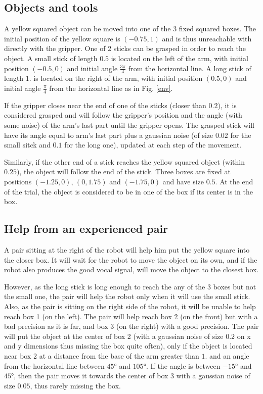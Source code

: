 \documentclass[conference]{include/IEEEtran}
\begin{document}
	
		
	\subsection{Objects and tools}
		
		A yellow squared object can be moved into one of the 3 fixed squared boxes. 
		The initial position of the yellow square is $(-0.75, 1)$ and is thus unreachable with directly with the gripper.
		One of 2 sticks can be grasped in order to reach the object.
		A small stick of length $0.5$ is located on the left of the arm, with initial position $(-0.5, 0)$ and initial angle $\frac{3\pi}{4}$ from the horizontal line.
		A long stick of length $1.$ is located on the right of the arm, with initial position $(0.5, 0)$ and initial angle $\frac{\pi}{4}$ from the horizontal line as in Fig. \ref{env}.
		
		If the gripper closes near the end of one of the sticks (closer than $0.2$), it is considered grasped and will follow the gripper's position and the angle (with some noise) of the arm's last part until the gripper opens.
		The grasped stick will have its angle equal to arm's last part plus a gaussian noise (of size $0.02$ for the small sitck and $0.1$ for the long one), updated at each step of the movement.
		
		Similarly, if the other end of a stick reaches the yellow squared object (within $0.25$), the object will follow the end of the stick.
		Three boxes are fixed at positions $(-1.25, 0)$, $(0, 1.75)$ and $(-1.75, 0)$ and have size $0.5$.
		At the end of the trial, the object is considered to be in one of the box if its center is in the box.
	
	
	\subsection{Help from an experienced pair}
	
		A pair sitting at the right of the robot will help him put the yellow square into the closer box.
		It will wait for the robot to move the object on its own, and if the robot also produces the good vocal signal, will move the object to the closest box.
		
		However, as the long stick is long enough to reach the any of the 3 boxes but not the small one, the pair will help the robot only when it will use the small stick.
		Also, as the pair is sitting on the right side of the robot, it will be unable to help reach box 1 (on the left).
		The pair will help reach box 2 (on the front) but with a bad precision as it is far, and box 3 (on the right) with a good precision.
		The pair will put the object at the center of box 2 (with a gaussian noise of size $0.2$ on x and y dimensions thus missing the box quite often), 
		only if the object is located near box 2 at a distance from the base of the arm greater than $1.$ and an angle from the horizontal line between $45°$ and $105°$.
		If the angle is between $-15°$ and $45°$, then the pair moves it towards the center of box 3 with a gaussian noise of size $0.05$, thus rarely missing the box.
		
\end{document}
